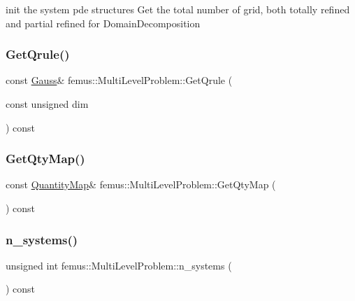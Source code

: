init the system pde structures Get the total number of grid, both totally refined and partial refined for Domain\+Decomposition \mbox{\label{classfemus_1_1_multi_level_problem_a1dfd69a30b627a2c75061cf0dd6bacba}} 
\subsubsection{\texorpdfstring{Get\+Qrule()}{GetQrule()}}
{\footnotesize\ttfamily const \mbox{\hyperlink{classfemus_1_1_gauss}{Gauss}}\& femus\+::\+Multi\+Level\+Problem\+::\+Get\+Qrule (\begin{DoxyParamCaption}\item[{const unsigned}]{dim }\end{DoxyParamCaption}) const\hspace{0.3cm}{\ttfamily [inline]}}

\mbox{\label{classfemus_1_1_multi_level_problem_aa23a970132432fac21483891443c3fb5}} 
\subsubsection{\texorpdfstring{Get\+Qty\+Map()}{GetQtyMap()}}
{\footnotesize\ttfamily const \mbox{\hyperlink{classfemus_1_1_quantity_map}{Quantity\+Map}}\& femus\+::\+Multi\+Level\+Problem\+::\+Get\+Qty\+Map (\begin{DoxyParamCaption}{ }\end{DoxyParamCaption}) const\hspace{0.3cm}{\ttfamily [inline]}}

\mbox{\label{classfemus_1_1_multi_level_problem_a4c2f6ed42514f3ce725df0c265c1404d}} 
\subsubsection{\texorpdfstring{n\+\_\+systems()}{n\_systems()}}
{\footnotesize\ttfamily unsigned int femus\+::\+Multi\+Level\+Problem\+::n\+\_\+systems (\begin{DoxyParamCaption}{ }\end{DoxyParamCaption}) const\hspace{0.3cm}{\ttfamily [inline]}}


